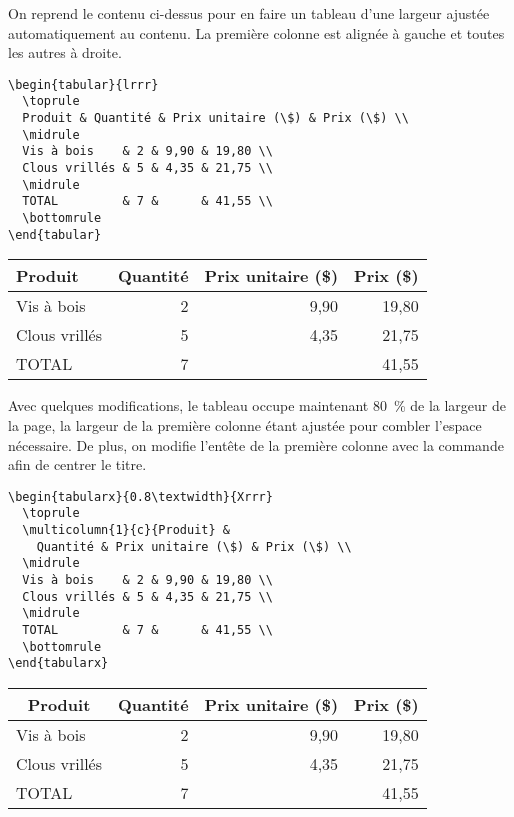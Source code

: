 \begin{exemple}
  On reprend le contenu ci-dessus pour en faire un tableau d'une
  largeur ajustée automatiquement au contenu. La première colonne est
  alignée à gauche et toutes les autres à droite.
\begin{lstlisting}
\begin{tabular}{lrrr}
  \toprule
  Produit & Quantité & Prix unitaire (\$) & Prix (\$) \\
  \midrule
  Vis à bois    & 2 & 9,90 & 19,80 \\
  Clous vrillés & 5 & 4,35 & 21,75 \\
  \midrule
  TOTAL         & 7 &      & 41,55 \\
  \bottomrule
\end{tabular}
\end{lstlisting}
  \begin{center}
    \begin{tabular}{lrrr}
      \toprule
      Produit & Quantité & Prix unitaire (\$) & Prix (\$) \\
      \midrule
      Vis à bois    & 2 & 9,90 & 19,80 \\
      Clous vrillés & 5 & 4,35 & 21,75 \\
      \midrule
      TOTAL         & 7 &      & 41,55 \\
      \bottomrule
    \end{tabular}
  \end{center}
  Avec quelques modifications, le tableau occupe maintenant 80~\% de
  la largeur de la page, la largeur de la première colonne étant
  ajustée pour combler l'espace nécessaire. De plus, on modifie
  l'entête de la première colonne avec la commande \cmd{\multicolumn}
  afin de centrer le titre.
\begin{lstlisting}
\begin{tabularx}{0.8\textwidth}{Xrrr}
  \toprule
  \multicolumn{1}{c}{Produit} &
    Quantité & Prix unitaire (\$) & Prix (\$) \\
  \midrule
  Vis à bois    & 2 & 9,90 & 19,80 \\
  Clous vrillés & 5 & 4,35 & 21,75 \\
  \midrule
  TOTAL         & 7 &      & 41,55 \\
  \bottomrule
\end{tabularx}
\end{lstlisting}
  \begin{center}
    \begin{tabularx}{0.8\textwidth}{Xrrr}
      \toprule
      \multicolumn{1}{c}{Produit} &
        Quantité & Prix unitaire (\$) & Prix (\$) \\
      \midrule
      Vis à bois    & 2 & 9,90 & 19,80 \\
      Clous vrillés & 5 & 4,35 & 21,75 \\
      \midrule
      TOTAL         & 7 &      & 41,55 \\
      \bottomrule
    \end{tabularx}
  \end{center}
\end{exemple}


